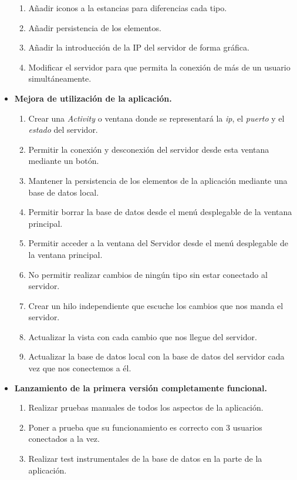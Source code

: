 \begin{itemize}
\begin{enumerate}
		\item Añadir iconos a la estancias para diferencias cada tipo.
		\item Añadir persistencia de los elementos.
		\item Añadir la introducción de la IP del servidor de forma gráfica.
		\item Modificar el servidor para que permita la conexión de más de un usuario simultáneamente.
	\end{enumerate}
	\item \textbf{Mejora de utilización de la aplicación.}
	\begin{enumerate}
		\item Crear una \textit{Activity} o ventana donde se representará la \textit{ip}, el \textit{puerto} y el \textit{estado} del servidor.
		\item Permitir la conexión y desconexión del servidor desde esta ventana mediante un botón.
		\item Mantener la persistencia de los elementos de la aplicación mediante una base de datos local.
		\item Permitir borrar la base de datos desde el menú desplegable de la ventana principal.
		\item Permitir acceder a la ventana del Servidor desde el menú desplegable de la ventana principal.
		\item No permitir realizar cambios de ningún tipo sin estar conectado al servidor.
		\item Crear un hilo independiente que escuche los cambios que nos manda el servidor.
		\item Actualizar la vista con cada cambio que nos llegue del servidor.
		\item Actualizar la base de datos local con la base de datos del servidor cada vez que nos conectemos a él.
	\end{enumerate}
	\item \textbf{Lanzamiento de la primera versión completamente funcional.}
	\begin{enumerate}
		\item Realizar pruebas manuales de todos los aspectos de la aplicación.
		\item Poner a prueba que su funcionamiento es correcto con 3 usuarios conectados a la vez.
		\item Realizar test instrumentales de la base de datos en la parte de la aplicación.
	\end{enumerate}
\end{itemize}

